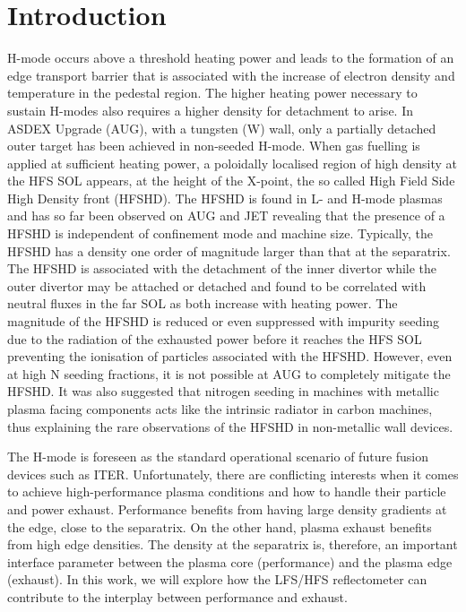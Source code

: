 \documentclass[12pt]{iopart}
\begin{document}
\section{Introduction}
\label{sec:intro}

H-mode occurs above a threshold heating power and leads to the formation of an edge transport barrier that is associated with the increase of electron density and temperature in the pedestal region\cite{wagner1982regime}. The higher heating power necessary to sustain H-modes also requires a higher density for detachment\cite{LaBombard1987,krasheninnikov1998physical} to arise. In ASDEX Upgrade (AUG), with a tungsten (W) wall, only a partially detached outer target has been achieved in non-seeded H-mode. When gas fuelling is applied at sufficient heating power, a poloidally localised region of high density at the HFS SOL appears, at the height of the X-point, the so called High Field Side High Density front (HFSHD). The HFSHD is found in L- and H-mode plasmas and has so far been observed on AUG\cite{mccormick2009main,Potzel2015} and JET\cite{potzel2015formation} revealing that the presence of a HFSHD is independent of confinement mode and machine size. Typically, the HFSHD has a density one order of magnitude larger than that at the separatrix. The HFSHD is associated with the detachment of the inner divertor while the outer divertor may be attached or detached and found to be correlated with neutral fluxes in the far SOL as both increase with heating power\cite{Reimold2015}. The magnitude of the HFSHD is reduced or even suppressed with impurity seeding due to the radiation of the exhausted power before it reaches the HFS SOL preventing the ionisation of particles associated with the HFSHD\cite{potzel2015formation}. However, even at high N seeding fractions, it is not possible at AUG to completely mitigate the HFSHD. It was also suggested that nitrogen seeding in machines with metallic plasma facing components acts like the intrinsic radiator in carbon machines\cite{potzel2015formation}, thus explaining the rare observations of the HFSHD in non-metallic wall devices\cite{mccormick2009main}. 

The H-mode is foreseen as the standard operational scenario of future fusion devices such as ITER. Unfortunately, there are conflicting interests when it comes to achieve high-performance plasma conditions and how to handle their particle and power exhaust. Performance benefits from having large density gradients at the edge, close to the separatrix\cite{schneider2014pedestal}. On the other hand, plasma exhaust benefits from high edge densities\cite{kallenbach2018parameter}. The density at the separatrix is, therefore, an important interface parameter between the plasma core (performance) and the plasma edge (exhaust). In this work, we will explore how the LFS/HFS reflectometer can contribute to the interplay between performance and exhaust.
\end{document}
